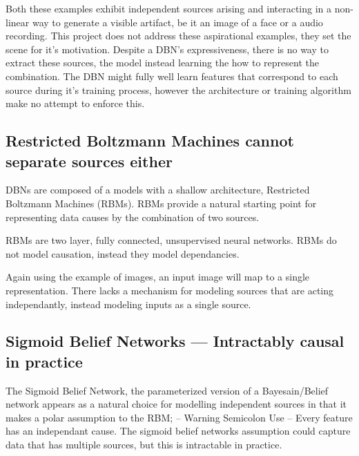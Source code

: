 Both these examples exhibit independent sources arising and interacting in a non-linear way to generate a visible artifact, be it an image of a face or a audio recording. This project does not address these aspirational examples, they set the scene for it's motivation. Despite a DBN's expressiveness, there is no way to extract these sources, the model instead learning the how to represent the combination. The DBN might fully well learn features that correspond to each source during it's training process, however the architecture or training algorithm make no attempt to enforce this.

\subsection{Restricted Boltzmann Machines cannot separate sources either}

DBNs are composed of a models with a shallow architecture, Restricted Boltzmann Machines (RBMs). RBMs provide a natural starting point for representing data causes by the combination of two sources.

RBMs are two layer, fully connected, unsupervised neural networks. RBMs do not model causation, instead they model dependancies.

  Again using the example of images, an input image will map to a single representation. There lacks a mechanism for modeling  sources that are acting independantly, instead modeling inputs as a single source.

\subsection{Sigmoid Belief Networks --- Intractably causal in practice}
The Sigmoid Belief Network, the parameterized version of a Bayesain/Belief network appears as a natural choice for modelling independent sources in that it makes a polar assumption to the RBM; -- Warning Semicolon Use -- Every feature has an independant cause. The sigmoid belief networks assumption could capture data that has multiple sources, but this is intractable in practice.


